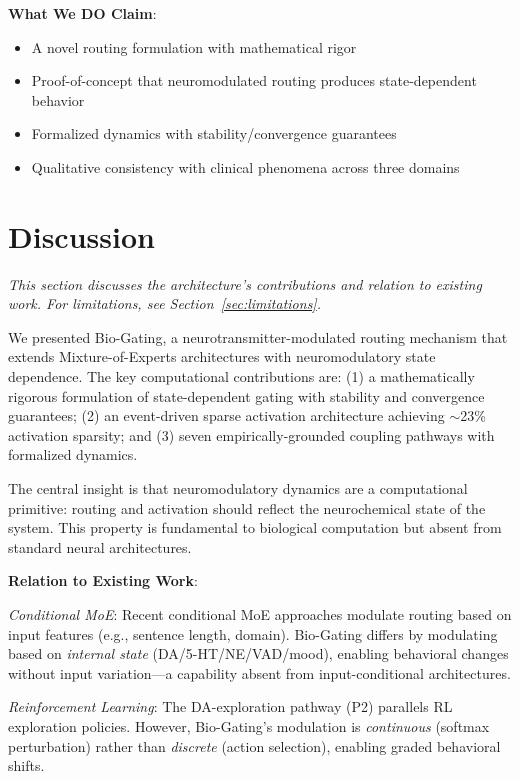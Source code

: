 \documentclass[preprint,12pt]{elsarticle}
\begin{document}
\textbf{What We DO Claim}:
\begin{itemize}
\item A novel routing formulation with mathematical rigor
\item Proof-of-concept that neuromodulated routing produces state-dependent behavior
\item Formalized dynamics with stability/convergence guarantees
\item Qualitative consistency with clinical phenomena across three domains
\end{itemize}

\section{Discussion}
\label{sec:discussion}

\textit{This section discusses the architecture's contributions and relation to existing work. For limitations, see Section~\ref{sec:limitations}.}

We presented Bio-Gating, a neurotransmitter-modulated routing mechanism that extends Mixture-of-Experts architectures with neuromodulatory state dependence. The key computational contributions are: (1) a mathematically rigorous formulation of state-dependent gating with stability and convergence guarantees; (2) an event-driven sparse activation architecture achieving $\sim$23\% activation sparsity; and (3) seven empirically-grounded coupling pathways with formalized dynamics.

The central insight is that neuromodulatory dynamics are a computational primitive: routing and activation should reflect the neurochemical state of the system. This property is fundamental to biological computation but absent from standard neural architectures.

\textbf{Relation to Existing Work}:

\textit{Conditional MoE}: Recent conditional MoE approaches \cite{conditional_moe} modulate routing based on input features (e.g., sentence length, domain). Bio-Gating differs by modulating based on \textit{internal state} (DA/5-HT/NE/VAD/mood), enabling behavioral changes without input variation---a capability absent from input-conditional architectures.

\textit{Reinforcement Learning}: The DA-exploration pathway (P2) parallels RL exploration policies. However, Bio-Gating's modulation is \textit{continuous} (softmax perturbation) rather than \textit{discrete} (action selection), enabling graded behavioral shifts.
\end{document}

